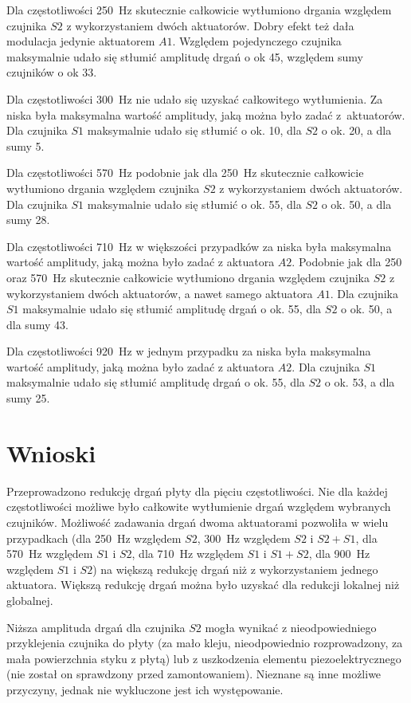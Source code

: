 \documentclass[polish,a4paper,11pt]{mwart}
\let\Oldsection\section
\renewcommand{\section}{\FloatBarrier\Oldsection}
\begin{document}
Dla częstotliwości \SI{250}{\hertz} skutecznie całkowicie wytłumiono drgania
względem czujnika $S2$ z wykorzystaniem dwóch aktuatorów. Dobry efekt też dała
modulacja jedynie aktuatorem $A1$. Względem pojedynczego czujnika
maksymalnie udało się stłumić amplitudę drgań o ok \SI{45}{\decibelV}, względem
sumy czujników o ok \SI{33}{\decibelV}.

Dla częstotliwości \SI{300}{\hertz} nie udało się uzyskać całkowitego
wytłumienia. Za niska była maksymalna wartość amplitudy, jaką można było zadać
z~aktuatorów.  Dla czujnika $S1$ maksymalnie udało się stłumić o ok.
\SI{10}{\decibelV}, dla $S2$ o ok. \SI{20}{\decibelV}, a dla sumy
\SI{5}{\decibelV}.

Dla częstotliwości \SI{570}{\hertz} podobnie jak dla \SI{250}{\hertz}
skutecznie całkowicie wytłumiono drgania względem czujnika $S2$ z wykorzystaniem
dwóch aktuatorów. Dla czujnika $S1$ maksymalnie udało się stłumić o ok.
\SI{55}{\decibelV}, dla $S2$ o ok. \SI{50}{\decibelV}, a dla sumy
\SI{28}{\decibelV}.

Dla częstotliwości \SI{710}{\hertz} w większości przypadków za niska była
maksymalna wartość amplitudy, jaką można było zadać z aktuatora $A2$.
Podobnie jak dla 250 oraz \SI{570}{\hertz} skutecznie całkowicie wytłumiono
drgania względem czujnika $S2$ z wykorzystaniem dwóch aktuatorów, a nawet samego
aktuatora $A1$. Dla czujnika $S1$ maksymalnie udało się stłumić
amplitudę drgań o ok. \SI{55}{\decibelV}, dla $S2$ o ok.
\SI{50}{\decibelV}, a dla sumy \SI{43}{\decibelV}.

Dla częstotliwości \SI{920}{\hertz} w jednym przypadku  za niska była
maksymalna wartość amplitudy, jaką można było zadać z aktuatora $A2$. Dla
czujnika $S1$ maksymalnie udało się stłumić amplitudę drgań o ok.
\SI{55}{\decibelV}, dla $S2$ o ok.  \SI{53}{\decibelV}, a dla sumy
\SI{25}{\decibelV}.

\section{Wnioski}

Przeprowadzono redukcję drgań płyty dla pięciu częstotliwości. Nie dla każdej
częstotliwości możliwe było całkowite wytłumienie drgań względem wybranych
czujników. Możliwość zadawania drgań dwoma aktuatorami pozwoliła w wielu
przypadkach (dla \SI{250}{\hertz} względem $S2$, \SI{300}{\hertz} względem $S2$
i $S2+S1$, dla \SI{570}{\hertz} względem $S1$ i $S2$, dla \SI{710}{\hertz}
względem $S1$ i $S1+S2$, dla \SI{900}{\hertz} względem $S1$ i $S2$) na większą
redukcję drgań niż z wykorzystaniem jednego aktuatora. Większą redukcję drgań
można było uzyskać dla redukcji lokalnej niż globalnej.

Niższa amplituda drgań dla czujnika $S2$ mogła wynikać z nieodpowiedniego
przyklejenia czujnika do płyty (za mało kleju, nieodpowiednio rozprowadzony, za
mała powierzchnia styku z płytą) lub z uszkodzenia elementu piezoelektrycznego
(nie został on sprawdzony przed zamontowaniem). Nieznane są inne możliwe
przyczyny, jednak nie wykluczone jest ich występowanie.

\printbibliography[title=Bibliografia]
\end{document}
